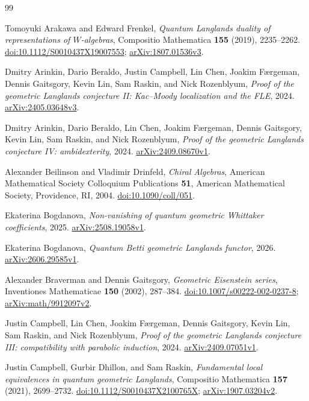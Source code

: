 \begin{thebibliography}{99}
\raggedright

Tomoyuki Arakawa and Edward Frenkel,
\emph{Quantum Langlands duality of representations of $W$-algebras},
Compositio Mathematica \textbf{155} (2019), 2235--2262.
\href{https://doi.org/10.1112/S0010437X19007553}{doi:10.1112/S0010437X19007553};
\href{https://arxiv.org/abs/1807.01536v3}{arXiv:1807.01536v3}.

Dmitry Arinkin, Dario Beraldo, Justin Campbell, Lin Chen, Joakim F\ae rgeman,
Dennis Gaitsgory, Kevin Lin, Sam Raskin, and Nick Rozenblyum,
\emph{Proof of the geometric Langlands conjecture II: Kac--Moody localization
and the FLE}, 2024.
\href{https://arxiv.org/abs/2405.03648v3}{arXiv:2405.03648v3}.

Dmitry Arinkin, Dario Beraldo, Lin Chen, Joakim F\ae rgeman,
Dennis Gaitsgory, Kevin Lin, Sam Raskin, and Nick Rozenblyum,
\emph{Proof of the geometric Langlands conjecture IV: ambidexterity}, 2024.
\href{https://arxiv.org/abs/2409.08670v1}{arXiv:2409.08670v1}.

Alexander Beilinson and Vladimir Drinfeld,
\emph{Chiral Algebras}, American Mathematical Society Colloquium
Publications \textbf{51}, American Mathematical Society, Providence, RI, 2004.
\href{https://doi.org/10.1090/coll/051}{doi:10.1090/coll/051}.

Ekaterina Bogdanova,
\emph{Non-vanishing of quantum geometric Whittaker coefficients}, 2025.
\href{https://arxiv.org/abs/2508.19058v1}{arXiv:2508.19058v1}.

Ekaterina Bogdanova,
\emph{Quantum Betti geometric Langlands functor}, 2026.
\href{https://arxiv.org/abs/2606.29585v1}{arXiv:2606.29585v1}.

Alexander Braverman and Dennis Gaitsgory,
\emph{Geometric Eisenstein series},
Inventiones Mathematicae \textbf{150} (2002), 287--384.
\href{https://doi.org/10.1007/s00222-002-0237-8}{doi:10.1007/s00222-002-0237-8};
\href{https://arxiv.org/abs/math/9912097v2}{arXiv:math/9912097v2}.

Justin Campbell, Lin Chen, Joakim F\ae rgeman, Dennis Gaitsgory,
Kevin Lin, Sam Raskin, and Nick Rozenblyum,
\emph{Proof of the geometric Langlands conjecture III: compatibility with
parabolic induction}, 2024.
\href{https://arxiv.org/abs/2409.07051v1}{arXiv:2409.07051v1}.

Justin Campbell, Gurbir Dhillon, and Sam Raskin,
\emph{Fundamental local equivalences in quantum geometric Langlands},
Compositio Mathematica \textbf{157} (2021), 2699--2732.
\href{https://doi.org/10.1112/S0010437X2100765X}{doi:10.1112/S0010437X2100765X};
\href{https://arxiv.org/abs/1907.03204v2}{arXiv:1907.03204v2}.


\end{thebibliography}
